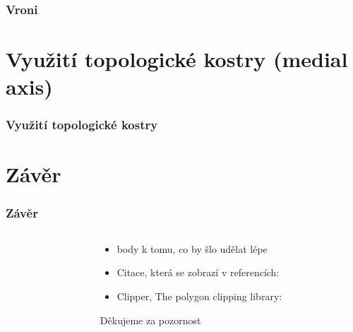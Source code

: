 \documentclass[notes=false,pdftex]{beamer}
\begin{document}

\begin{frame}
	\frametitle{Vroni}

\end{frame}


\section{Využití topologické kostry (medial axis)}
\begin{frame}
	\frametitle{Využití topologické kostry}

\end{frame}


\section{Závěr}
\begin{frame}
	\frametitle{Závěr}

	\begin{columns}[T]
		\begin{column}{0.5\textwidth}
		\end{column}
		\begin{column}{0.5\textwidth}
			\begin{itemize}
				\item body k tomu, co by šlo udělat lépe\pause
				\item Citace, která se zobrazí v referencích: \cite{Wurm2008Coordinated}
				\item Clipper, The polygon clipping library: \cite{ClipperLib}
			\end{itemize}
			\pause
			\vspace{13ex}\hspace*{\fill}Děkujeme za pozornost
		\end{column}
	\end{columns}

\end{frame}
\end{document}

